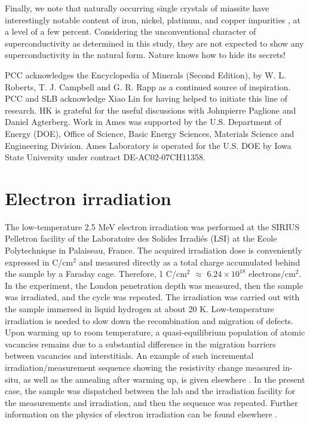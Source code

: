 \documentclass[aps,pra,reprint,superscriptaddress,floatfix]{revtex4-2}
\begin{document}
Finally, we note that naturally occurring single crystals of miassite have interestingly notable content of iron, nickel, platinum, and copper impurities \cite{impurities}, at a level of a few percent. Considering the unconventional character of superconductivity as determined in this study, they are not expected to show any superconductivity in the natural form. Nature knows how to hide its secrets!

\begin{acknowledgments}
PCC acknowledges the Encyclopedia of Minerals (Second Edition), by W. L. Roberts, T. J. Campbell and G. R. Rapp as a continued source of inspiration.
PCC and SLB acknowledge Xiao Lin for having helped to initiate this line of research.
HK is grateful for the useful discussions with Johnpierre Paglione and Daniel Agterberg. Work in Ames was supported by the U.S. Department of Energy (DOE), Office of Science, Basic Energy Sciences, Materials Science and Engineering Division. Ames Laboratory is operated for the U.S. DOE by Iowa State University under contract DE-AC02-07CH11358.
\end{acknowledgments}




\newpage


\appendix

\section{Electron irradiation}
The low-temperature 2.5 MeV electron irradiation was performed at the SIRIUS Pelletron facility of the Laboratoire des Solides Irradi\'es (LSI) at the Ecole Polytechnique in Palaiseau, France. 
The acquired irradiation dose is conveniently expressed in C/cm$^2$ and measured directly as a total charge accumulated behind the sample by a Faraday cage. 
Therefore, 1 C/cm$^2$ $\approx$ $6.24 \times 10^{18}$ electrons/cm$^2$. 
In the experiment, the London penetration depth was measured, then the sample was irradiated, and the cycle was repeated. 
The irradiation was carried out with the sample immersed in liquid hydrogen at about 20 K. 
Low-temperature irradiation is needed to slow down the recombination and migration of defects. Upon warming up to room temperature, a quasi-equilibrium population of atomic vacancies remains due to a substantial difference in the migration barriers between vacancies and interstitials. 
An example of such incremental irradiation/measurement sequence showing the resistivity change measured in-situ, as well as the annealing after warming up, is given elsewhere \cite{Prozorov2014}. 
In the present case, the sample was dispatched between the lab and the irradiation facility for the measurements and irradiation, and then the sequence was repeated. Further information on the physics of electron irradiation can be found elsewhere \cite{Damask1963, Thompson1969}.
\end{document}
